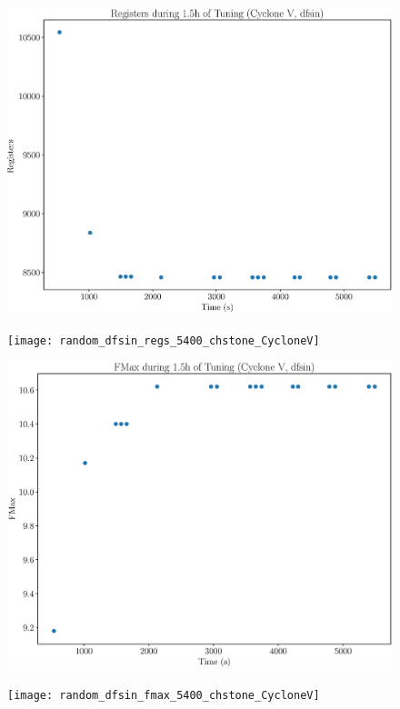 \documentclass[12pt, a4paper]{article}
\begin{document}
\begin{figure}[htpb]
    \begin{minipage}{.48\textwidth}
        \includegraphics[scale=.25]{dfsin_regs_5400_chstone_CycloneV}
    \end{minipage}%
    \hfill
    \begin{minipage}{.48\textwidth}
        \texttt{[image: random\_dfsin\_regs\_5400\_chstone\_CycloneV]}
    \end{minipage}%

    \begin{minipage}{.48\textwidth}
        \includegraphics[scale=.25]{dfsin_fmax_5400_chstone_CycloneV}
    \end{minipage}%
    \hfill
    \begin{minipage}{.48\textwidth}
        \texttt{[image: random\_dfsin\_fmax\_5400\_chstone\_CycloneV]}
    \end{minipage}%
\end{figure}
\end{document}
